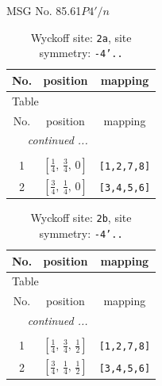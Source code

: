 \documentclass[fleqn,8pt]{jsarticle}
\begin{document}
\setcounter{MaxMatrixCols}{32}

\renewcommand{\tablename}{Table~}
\renewcommand{\figurename}{Figure~}
\begin{center}
\LARGE
MSG No. 85.61\quad$P4'/n$
\end{center}
\renewcommand{\arraystretch}{1.2}
\begin{longtable}{ccc}
\caption{Wyckoff site: {\tt 2a}, site symmetry: {\tt -4'..}}
 \\
 \hline \hline
No. & position & mapping \\ \hline \endfirsthead

\multicolumn{2}{l}{\tablename\ \thetable{}} \\
 \hline \hline
No. & position & mapping \\ \hline \endhead

 \hline \hline
\multicolumn{2}{r}{\footnotesize\it continued ...} \\ \endfoot

 \hline \hline
\multicolumn{2}{r}{} \\ \endlastfoot

1 & $\left[ \frac{1}{4},\, \frac{3}{4},\, 0 \right]$ & {\tt [1,2,7,8]} \\ \hline
2 & $\left[ \frac{3}{4},\, \frac{1}{4},\, 0 \right]$ & {\tt [3,4,5,6]} \\
\end{longtable}
\renewcommand{\arraystretch}{1.2}
\begin{longtable}{ccc}
\caption{Wyckoff site: {\tt 2b}, site symmetry: {\tt -4'..}}
 \\
 \hline \hline
No. & position & mapping \\ \hline \endfirsthead

\multicolumn{2}{l}{\tablename\ \thetable{}} \\
 \hline \hline
No. & position & mapping \\ \hline \endhead

 \hline \hline
\multicolumn{2}{r}{\footnotesize\it continued ...} \\ \endfoot

 \hline \hline
\multicolumn{2}{r}{} \\ \endlastfoot

1 & $\left[ \frac{1}{4},\, \frac{3}{4},\, \frac{1}{2} \right]$ & {\tt [1,2,7,8]} \\ \hline
2 & $\left[ \frac{3}{4},\, \frac{1}{4},\, \frac{1}{2} \right]$ & {\tt [3,4,5,6]} \\
\end{longtable}
\end{document}
